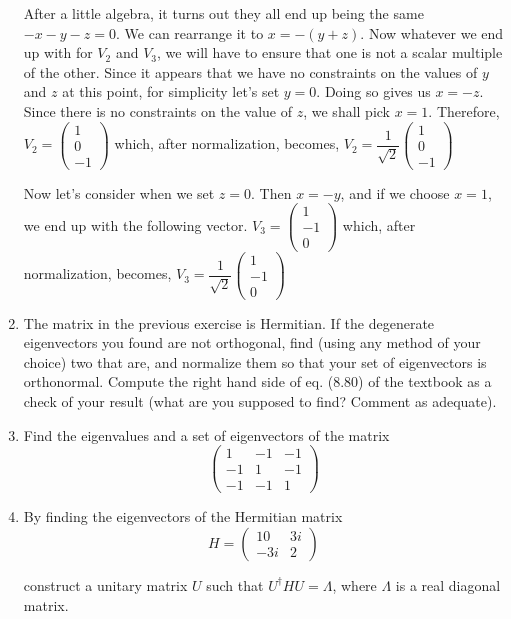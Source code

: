 \documentclass[fleqn]{article}
\begin{document}
\begin{enumerate}
      \textcolor{hwColor}{
        After a little algebra, it turns out they all end up being the same $-x-y-z=0$. We can rearrange it to $x=-(y+z)$. Now whatever we end up with for $V_2$ and $V_3$,
        we will have to ensure that one is not a scalar multiple of the other. Since it appears that we have no constraints on the values of $y$ and $z$ at this point, for simplicity let's set $y=0$.
        Doing so gives us $x=-z$. Since there is no constraints on the value of $z$, we shall pick $x=1$. Therefore,       
        $
        V_2=\begin{pmatrix}
          1 \\
          0 \\
          -1
        \end{pmatrix}
        $
        which, after normalization, becomes, $V_2=\dfrac{1}{\sqrt{2}} \begin{pmatrix}
          1 \\
          0 \\
          -1
        \end{pmatrix}
        $
      }

      \textcolor{hwColor}{
        Now let's consider when we set $z=0$. Then $x=-y$, and if we choose $x=1$, we end up with the following vector.       
        $
        V_3=\begin{pmatrix}
          1 \\
          -1 \\
          0
        \end{pmatrix}
        $
        which, after normalization, becomes, $V_3=\dfrac{1}{\sqrt{2}} \begin{pmatrix}
          1 \\
          -1 \\
          0
        \end{pmatrix}
        $
      }

    \item The matrix in the previous exercise is Hermitian. If the degenerate eigenvectors you found are not orthogonal, find (using any method of your choice) two that are, and normalize them so that your set of eigenvectors is orthonormal.
      Compute the right hand side of eq. (8.80) of the textbook as a check of your result (what are you supposed to find? Comment as adequate).

    \item Find the eigenvalues and a set of eigenvectors of the matrix
      $$ 
      \begin{pmatrix}
      1 & -1 & -1 \\
      -1 & 1 & -1 \\
      -1 & -1 & 1
      \end{pmatrix}
      $$

    
    \item By finding the eigenvectors of the Hermitian matrix
      $$H= 
      \begin{pmatrix}
      10 & 3i \\
      -3i & 2 
      \end{pmatrix}
      $$

      construct a unitary matrix $U$ such that $U^\dagger HU=\Lambda$, where $\Lambda$ is a real  diagonal matrix. 

  \end{enumerate}
\end{document}
